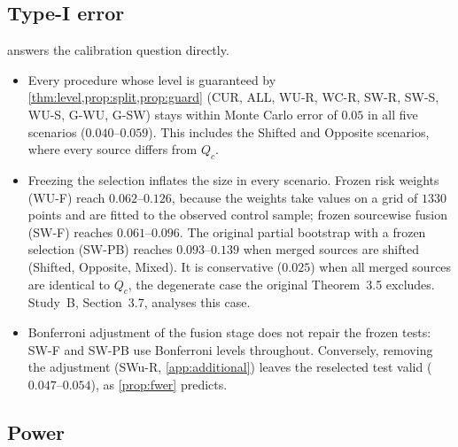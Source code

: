 \subsection{Type-I error}\label{sec:typeI}

\begin{table}[t]
\centering\scriptsize
\setlength{\tabcolsep}{3.2pt}
\caption{Null rejection rates (A\_main, $m=40$, $2000$ data sets per row; Monte Carlo s.e.\ $\approx0.005$). Bold with $\uparrow$: Wilson 95\% interval entirely above $0.05$.}\label{tab:null}

\end{table}

 answers the calibration question directly.
\begin{itemize}[leftmargin=1.4em,itemsep=1pt]
\item Every procedure whose level is guaranteed by \cref{thm:level,prop:split,prop:guard} (CUR, ALL, WU-R, WC-R, SW-R, SW-S, WU-S, G-WU, G-SW) stays within Monte Carlo error of $0.05$ in all five scenarios ($0.040$--$0.059$). This includes the Shifted and Opposite scenarios, where every source differs from $Q_c$.
\item Freezing the selection inflates the size in every scenario. Frozen risk weights (WU-F) reach $0.062$--$0.126$, because the weights take values on a grid of $1330$ points and are fitted to the observed control sample; frozen sourcewise fusion (SW-F) reaches $0.061$--$0.096$. The original partial bootstrap with a frozen selection (SW-PB) reaches $0.093$--$0.139$ when merged sources are shifted (Shifted, Opposite, Mixed). It is conservative ($0.025$) when all merged sources are identical to $Q_c$, the degenerate case the original Theorem~3.5 excludes. Study~B, Section~3.7, analyses this case.
\item Bonferroni adjustment of the fusion stage does not repair the frozen tests: SW-F and SW-PB use Bonferroni levels throughout. Conversely, removing the adjustment (SWu-R, \cref{app:additional}) leaves the reselected test valid ($0.047$--$0.054$), as \cref{prop:fwer} predicts.
\end{itemize}

\subsection{Power}\label{sec:powerres}

\begin{table}[!htbp]
\centering\scriptsize
\setlength{\tabcolsep}{2.6pt}
\caption{Rejection rates under alternatives (A\_main, $m=40$, $n=80$, $\ell_j=80$; $1000$ data sets per row). Bold: at least $0.03$ above CUR; italic: at least $0.03$ below CUR. Frozen procedures (WU-F, SW-F, SW-PB) do not control the level (\cref{tab:null}), so their power is not comparable.}\label{tab:power}

\end{table}

